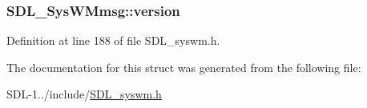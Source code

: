 \subsubsection[{version}]{ S\+D\+L\+\_\+\+Sys\+W\+Mmsg\+::version}\label{struct_s_d_l___sys_w_mmsg_a95f9aae58d18ee8fac556416b322a5fb}


Definition at line 188 of file S\+D\+L\+\_\+syswm.\+h.



The documentation for this struct was generated from the following file\+:\begin{DoxyCompactItemize}
\item 
S\+D\+L-\/1../include/\hyperlink{_s_d_l__syswm_8h}{S\+D\+L\+\_\+syswm.\+h}\end{DoxyCompactItemize}
